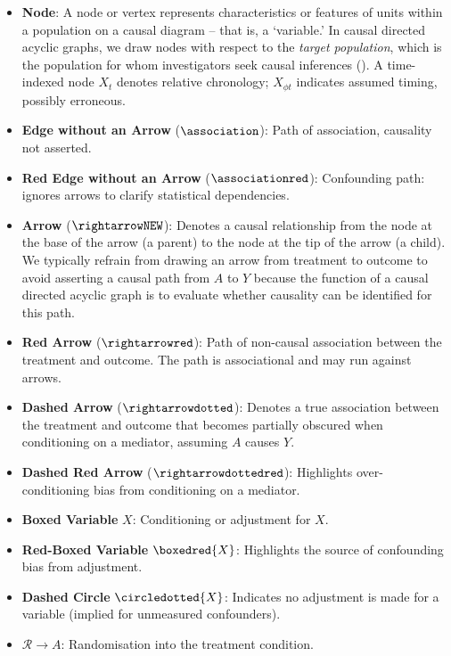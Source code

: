 \documentclass[
  single column]{article}
\begin{document}
\begin{itemize}
\item
  \textbf{Node}: A node or vertex represents characteristics or features
  of units within a population on a causal diagram -- that is, a
  `variable.' In causal directed acyclic graphs, we draw nodes with
  respect to the \emph{target population}, which is the population for
  whom investigators seek causal inferences
  (). A time-indexed
  node \(X_t\) denotes relative chronology; \(X_{\phi t}\) indicates
  assumed timing, possibly erroneous.
\item
  \textbf{Edge without an Arrow} (\(\association\)): Path of
  association, causality not asserted.
\item
  \textbf{Red Edge without an Arrow} (\(\associationred\)): Confounding
  path: ignores arrows to clarify statistical dependencies.
\item
  \textbf{Arrow} (\(\rightarrowNEW\)): Denotes a causal relationship
  from the node at the base of the arrow (a parent) to the node at the
  tip of the arrow (a child). We typically refrain from drawing an arrow
  from treatment to outcome to avoid asserting a causal path from \(A\)
  to \(Y\) because the function of a causal directed acyclic graph is to
  evaluate whether causality can be identified for this path.
\item
  \textbf{Red Arrow} (\(\rightarrowred\)): Path of non-causal
  association between the treatment and outcome. The path is
  associational and may run against arrows.
\item
  \textbf{Dashed Arrow} (\(\rightarrowdotted\)): Denotes a true
  association between the treatment and outcome that becomes partially
  obscured when conditioning on a mediator, assuming \(A\) causes \(Y\).
\item
  \textbf{Dashed Red Arrow} (\(\rightarrowdottedred\)): Highlights
  over-conditioning bias from conditioning on a mediator.
\item
  \textbf{Boxed Variable} \(\boxed{X}\): Conditioning or adjustment for
  \(X\).
\item
  \textbf{Red-Boxed Variable} \(\boxedred{X}\): Highlights the source of
  confounding bias from adjustment.
\item
  \textbf{Dashed Circle} \(\circledotted{X}\): Indicates no adjustment
  is made for a variable (implied for unmeasured confounders).
\item
  \textbf{\(\mathcal{R} \rightarrow A\)}: Randomisation into the
  treatment condition.
\end{itemize}
\end{document}
